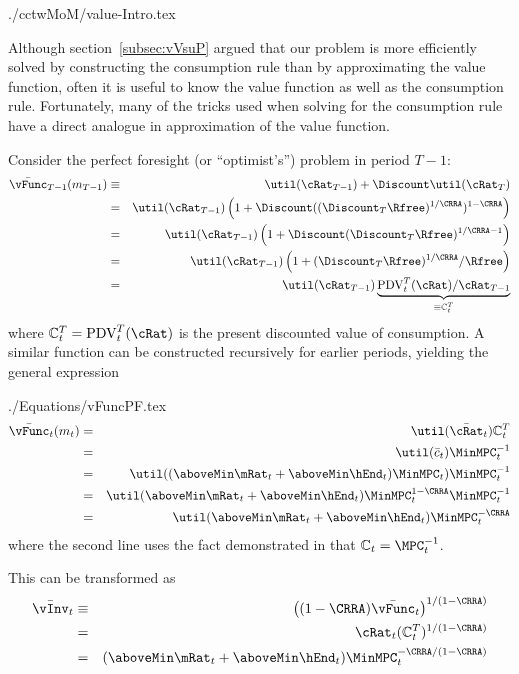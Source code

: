 \documentclass[titlepage]{\econtex}
\begin{document}
\begin{verbatimwrite}{./cctwMoM/value-Intro.tex}

  Although section~\ref{subsec:vVsuP} argued that our problem is more
  efficiently solved by constructing the consumption rule than by
  approximating the value function, often it is useful to know the
  value function as well as the consumption rule.  Fortunately, many
  of the tricks used when solving for the consumption rule have a 
  direct analogue in approximation of the value function.

Consider the perfect foresight (or ``optimist's'') problem in period $T-1$:
\begin{eqnarray*}
  \bar{\vFunc}_{T-1}({m}_{T-1}) & \equiv & \util(\cRat_{T-1})+\Discount \util(\cRat_{T})
\\ & = & \util(\cRat_{T-1})\left(1+\Discount ((\Discount_{T}\Rfree)^{1/\CRRA})^{1-\CRRA}\right)
\\ & = & \util(\cRat_{T-1})\left(1+\Discount (\Discount_{T}\Rfree)^{1/\CRRA-1}\right)
\\ & = & \util(\cRat_{T-1})\left(1+(\Discount_{T}\Rfree)^{1/\CRRA}/\Rfree\right)
\\ & = & \util(\cRat_{T-1})\underbrace{\mbox{PDV}_{t}^{T}(\cRat)/\cRat_{T-1}}_{\equiv \mathbb{C}_{t}^{T}}
\end{eqnarray*}
where $\mathbb{C}_{t}^{T}=\mbox{PDV}_{t}^{T}(\cRat)$ is the present discounted value of consumption.
A similar function can be constructed recursively for earlier periods, yielding
the general expression \hypertarget{vFuncPF}{}
\end{verbatimwrite}

\begin{verbatimwrite}{./Equations/vFuncPF.tex}
\begin{eqnarray}
  \bar{\vFunc}_{t}({m}_{t}) & = & \util(\bar{\cRat}_{t})\mathbb{C}_{t}^{T}\label{eq:vFuncPF}
  \\ & = & \util(\bar{c}_{t}) \MinMPC_{t}^{-1} %
  \\ & = & \util((\aboveMin \mRat_{t}+\aboveMin \hEnd_{t})\MinMPC_{t}) \MinMPC_{t}^{-1} %
  \\ & = & \util(\aboveMin \mRat_{t}+\aboveMin \hEnd_{t})\MinMPC_{t}^{1-\CRRA} \MinMPC_{t}^{-1} %
  \\ & = & \util(\aboveMin \mRat_{t}+\aboveMin \hEnd_{t})\MinMPC_{t}^{-\CRRA}  %
\end{eqnarray}
where the second line uses the fact demonstrated in \cite{BufferStockTheory} that $\mathbb{C}_{t}=\MPC^{-1}_{t}$. %

This can be transformed as
\begin{eqnarray*}
  \bar{\vInv}_{t} & \equiv & \left((1-\CRRA)\bar{\vFunc}_{t}\right)^{1/(1-\CRRA)}
\\ & = & \cRat_{t}(\mathbb{C}_{t}^{T})^{1/(1-\CRRA)}
\\ & = & (\aboveMin \mRat_{t}+\aboveMin \hEnd_{t})\MinMPC_{t}^{-\CRRA/(1-\CRRA)}   %
\end{eqnarray*}
\end{verbatimwrite}
\end{document}
